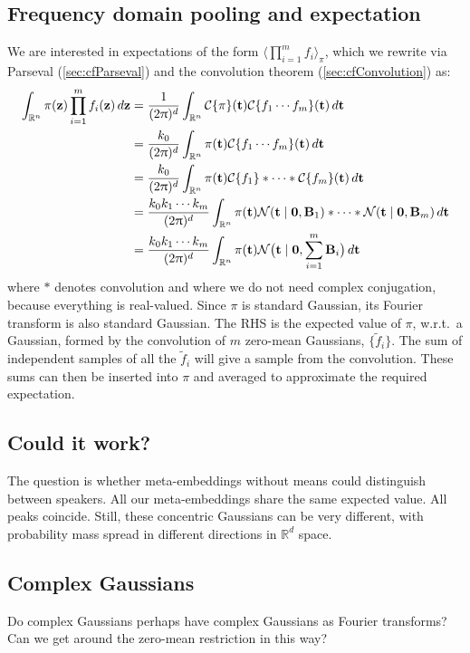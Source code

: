 \documentclass[a4paper,oneside,12pt,english]{report}
\def\zvec{\mathbf{z}}
\def\ND{\mathcal{N}}
\def\expv#1#2{\bigl\langle#1\bigr\rangle_{#2}}
\def\R{\mathbb{R}}
\def\Bmat{\mathbf{B}}
\def\nulvec{\boldsymbol{0}}
\def\Cset{\mathcal{C}}
\newcommand\CT[2][]{\Cset_{#1}\{#2\}}
\begin{document}
\subsection{Frequency domain pooling and expectation}
We are interested in expectations of the form $\expv{\prod_{i=1}^m f_i}{\pi}$, which we rewrite via Parseval (\ref{sec:cfParseval}) and the convolution theorem (\ref{sec:cfConvolution}) as:
\begin{align}
\begin{split}
\int_{\R^n} \pi(\zvec) \prod_{i=1}^m f_i(\zvec)  \,d\zvec  
&= \frac{1}{(2\uppi)^d}\int_{\R^n} \CT{\pi}(\tvec) \CT{f_1\cdots f_m}(\tvec) \,d\tvec  \\
&= \frac{k_0}{(2\uppi)^d}\int_{\R^n} \pi(\tvec) \CT{f_1\cdots f_m}(\tvec) \,d\tvec  \\
&= \frac{k_0}{(2\uppi)^d}\int_{\R^n} \pi(\tvec) \CT{f_1}\ast\cdots\ast\CT{f_m}(\tvec) \,d\tvec  \\
&= \frac{k_0k_1\cdots k_m}{(2\uppi)^d}\int_{\R^n} \pi(\tvec) \ND(\tvec\mid\nulvec,\Bmat_1)\ast\cdots\ast\ND(\tvec\mid\nulvec,\Bmat_m) \,d\tvec  \\
&= \frac{k_0k_1\cdots k_m}{(2\uppi)^d}\int_{\R^n} \pi(\tvec) \ND\bigl(\tvec\mid\nulvec,\sum_{i=1}^m\Bmat_i\bigr) \,d\tvec  \\
\end{split}
\end{align}
where $\ast$ denotes convolution and where we do not need complex conjugation, because everything is real-valued. Since $\pi$ is standard Gaussian, its Fourier transform is also standard Gaussian. The RHS is the expected value of $\pi$, w.r.t.\ a Gaussian, formed by the convolution of $m$ zero-mean Gaussians, $\{\tilde f_i\}$. The sum of independent samples of all the $\tilde f_i$ will give a sample from the convolution. These sums can then be inserted into $\pi$ and averaged to approximate the required expectation.

\subsection{Could it work?}
The question is whether meta-embeddings without means could distinguish between speakers. All our meta-embeddings share the same expected value. All peaks coincide. Still, these concentric Gaussians can be very different, with probability mass spread in different directions in $\R^d$ space. 

\subsection{Complex Gaussians}
Do complex Gaussians perhaps have complex Gaussians as Fourier transforms? Can we get around the zero-mean restriction in this way? 
\end{document}
